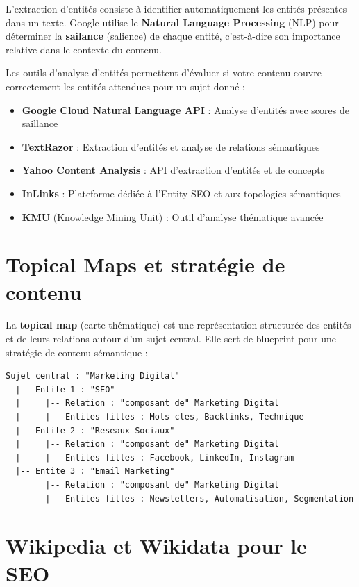 \documentclass[12pt,a4paper,twoside]{report}
\newcommand{\keyword}[1]{\textbf{\textcolor{googleblue}{#1}}}
\begin{document}
L'extraction d'entités consiste à identifier automatiquement les entités présentes dans un texte. Google utilise le \keyword{Natural Language Processing} (NLP) pour déterminer la \keyword{sailance} (salience) de chaque entité, c'est-à-dire son importance relative dans le contexte du contenu.

Les outils d'analyse d'entités permettent d'évaluer si votre contenu couvre correctement les entités attendues pour un sujet donné :

\begin{itemize}
    \item \textbf{Google Cloud Natural Language API} : Analyse d'entités avec scores de saillance
    \item \textbf{TextRazor} : Extraction d'entités et analyse de relations sémantiques
    \item \textbf{Yahoo Content Analysis} : API d'extraction d'entités et de concepts
    \item \textbf{InLinks} : Plateforme dédiée à l'Entity SEO et aux topologies sémantiques
    \item \textbf{KMU} (Knowledge Mining Unit) : Outil d'analyse thématique avancée
\end{itemize}

\section{Topical Maps et stratégie de contenu}

La \keyword{topical map} (carte thématique) est une représentation structurée des entités et de leurs relations autour d'un sujet central. Elle sert de blueprint pour une stratégie de contenu sémantique :

\begin{lstlisting}[style=code,caption={Exemple de structure de topical map}]
Sujet central : "Marketing Digital"
  |-- Entite 1 : "SEO"
  |     |-- Relation : "composant de" Marketing Digital
  |     |-- Entites filles : Mots-cles, Backlinks, Technique
  |-- Entite 2 : "Reseaux Sociaux"
  |     |-- Relation : "composant de" Marketing Digital
  |     |-- Entites filles : Facebook, LinkedIn, Instagram
  |-- Entite 3 : "Email Marketing"
        |-- Relation : "composant de" Marketing Digital
        |-- Entites filles : Newsletters, Automatisation, Segmentation
\end{lstlisting}

\section{Wikipedia et Wikidata pour le SEO}
\end{document}
